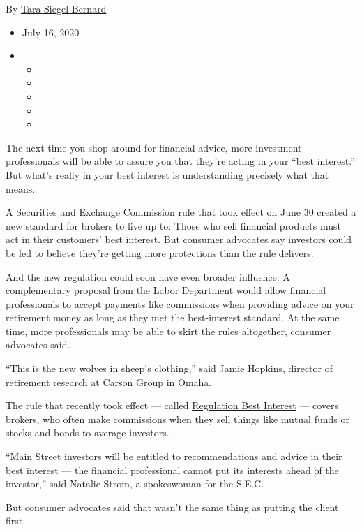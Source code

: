 By \href{https://www.nytimes3xbfgragh.onion/by/tara-siegel-bernard}{Tara
Siegel Bernard}

\begin{itemize}
\item
  July 16, 2020
\item
  \begin{itemize}
  \item
  \item
  \item
  \item
  \item
  \end{itemize}
\end{itemize}

The next time you shop around for financial advice, more investment
professionals will be able to assure you that they're acting in your
``best interest.'' But what's really in your best interest is
understanding precisely what that means.

A Securities and Exchange Commission rule that took effect on June 30
created a new standard for brokers to live up to: Those who sell
financial products must act in their customers' best interest. But
consumer advocates say investors could be led to believe they're getting
more protections than the rule delivers.

And the new regulation could soon have even broader influence: A
complementary proposal from the Labor Department would allow financial
professionals to accept payments like commissions when providing advice
on your retirement money as long as they met the best-interest standard.
At the same time, more professionals may be able to skirt the rules
altogether, consumer advocates said.

``This is the new wolves in sheep's clothing,'' said Jamie Hopkins,
director of retirement research at Carson Group in Omaha.

The rule that recently took effect --- called
\href{https://www.nytimes3xbfgragh.onion/2019/06/05/your-money/sec-investment-brokers-fiduciary-duty.html}{Regulation
Best Interest} --- covers brokers, who often make commissions when they
sell things like mutual funds or stocks and bonds to average investors.

``Main Street investors will be entitled to recommendations and advice
in their best interest --- the financial professional cannot put its
interests ahead of the investor,'' said Natalie Strom, a spokeswoman for
the S.E.C.

But consumer advocates said that wasn't the same thing as putting the
client first.

